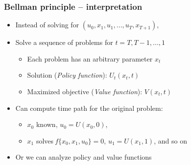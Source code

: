 \documentclass[bigger,handout]{beamer}
\begin{document}
\begin{frame}%

\frametitle{Bellman principle -- interpretation}

\begin{itemize}
\item Instead of solving for $\left(
u_{0},x_{1},u_{1},...,u_{T},x_{T+1}\right) $,

\item Solve a sequence of problems for $t=T,T-1,...,1$\

\begin{itemize}
\item Each problem has an arbitrary parameter $x_{t}$

\item Solution (\emph{Policy function}): $U_{t}\left( x_{t},t\right) $

\item Maximized objective (\emph{Value function}): $V(x_{t},t)$
\end{itemize}

\item Can compute time path for the original problem:

\begin{itemize}
\item $x_{0}$ known, $u_{0}=U\left( x_{0},0\right) $,

\item $x_{1}$ solves$\ f\{x_{0},x_{1},u_{0}\}=0$, $u_{1}=U\left(
x_{1},1\right) $, and so on
\end{itemize}

\item Or we can analyze policy and value functions
\end{itemize}



\end{frame}%
\end{document}

